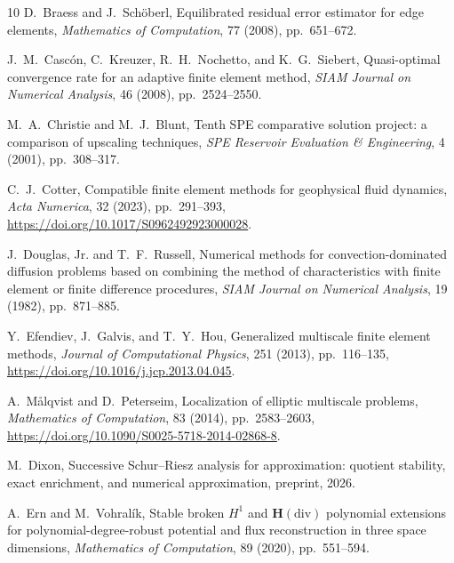 \documentclass[11pt]{article}
\numberwithin{algorithm}{section}
\theoremstyle{definition}\newtheorem{definition}[theorem]{Definition}
\theoremstyle{remark}\newtheorem{remark}[theorem]{Remark}
\begin{document}
\begin{thebibliography}{10}
D.~Braess and J.~Sch\"oberl,
\newblock Equilibrated residual error estimator for edge elements,
\newblock \emph{Mathematics of Computation}, 77 (2008), pp.~651--672.

J.~M.~Casc\'on, C.~Kreuzer, R.~H.~Nochetto, and K.~G.~Siebert,
\newblock Quasi-optimal convergence rate for an adaptive finite element method,
\newblock \emph{SIAM Journal on Numerical Analysis}, 46 (2008),
pp.~2524--2550.

M.~A.~Christie and M.~J.~Blunt,
\newblock Tenth SPE comparative solution project: a comparison of upscaling
techniques,
\newblock \emph{SPE Reservoir Evaluation \& Engineering}, 4 (2001),
pp.~308--317.

C.~J.~Cotter,
\newblock Compatible finite element methods for geophysical fluid dynamics,
\newblock \emph{Acta Numerica}, 32 (2023), pp.~291--393,
\newblock \url{https://doi.org/10.1017/S0962492923000028}.

J.~Douglas, Jr. and T.~F.~Russell,
\newblock Numerical methods for convection-dominated diffusion problems based
on combining the method of characteristics with finite element or finite
difference procedures,
\newblock \emph{SIAM Journal on Numerical Analysis}, 19 (1982),
pp.~871--885.

Y.~Efendiev, J.~Galvis, and T.~Y.~Hou,
\newblock Generalized multiscale finite element methods,
\newblock \emph{Journal of Computational Physics}, 251 (2013), pp.~116--135,
\newblock \url{https://doi.org/10.1016/j.jcp.2013.04.045}.

A.~M\aa lqvist and D.~Peterseim,
\newblock Localization of elliptic multiscale problems,
\newblock \emph{Mathematics of Computation}, 83 (2014), pp.~2583--2603,
\newblock \url{https://doi.org/10.1090/S0025-5718-2014-02868-8}.

M.~Dixon,
\newblock Successive Schur--Riesz analysis for approximation: quotient
stability, exact enrichment, and numerical approximation,
\newblock preprint, 2026.

A.~Ern and M.~Vohral\'ik,
\newblock Stable broken $H^1$ and $\boldsymbol H(\mathrm{div})$ polynomial
extensions for polynomial-degree-robust potential and flux reconstruction in
three space dimensions,
\newblock \emph{Mathematics of Computation}, 89 (2020), pp.~551--594.


\end{thebibliography}
\end{document}
